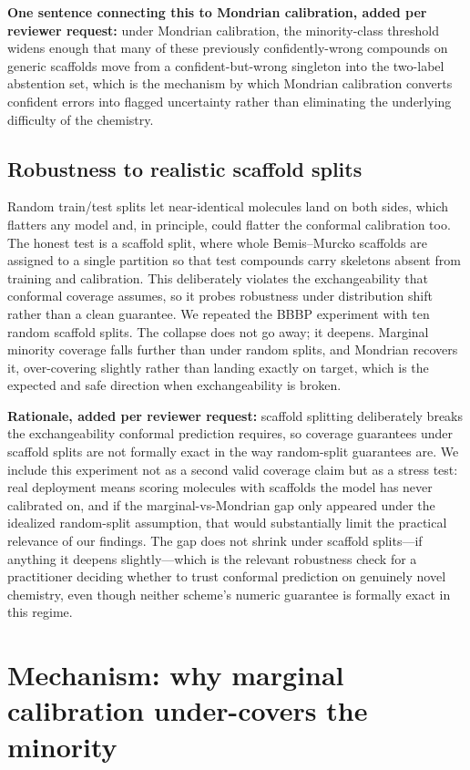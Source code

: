 \documentclass[11pt]{article}
\begin{document}
\textbf{One sentence connecting this to Mondrian calibration, added per reviewer request:} under
Mondrian calibration, the minority-class threshold widens enough that many of these previously
confidently-wrong compounds on generic scaffolds move from a confident-but-wrong singleton into the
two-label abstention set, which is the mechanism by which Mondrian calibration converts confident
errors into flagged uncertainty rather than eliminating the underlying difficulty of the chemistry.

\subsection{Robustness to realistic scaffold splits}

Random train/test splits let near-identical molecules land on both sides, which flatters any model
and, in principle, could flatter the conformal calibration too. The honest test is a scaffold
split, where whole Bemis--Murcko scaffolds are assigned to a single partition so that test compounds
carry skeletons absent from training and calibration. This deliberately violates the exchangeability
that conformal coverage assumes, so it probes robustness under distribution shift rather than a
clean guarantee. We repeated the BBBP experiment with ten random scaffold splits. The collapse does
not go away; it deepens. Marginal minority coverage falls further than under random splits, and
Mondrian recovers it, over-covering slightly rather than landing exactly on target, which is the
expected and safe direction when exchangeability is broken.

\textbf{Rationale, added per reviewer request:} scaffold splitting deliberately breaks the
exchangeability conformal prediction requires, so coverage guarantees under scaffold splits are not
formally exact in the way random-split guarantees are. We include this experiment not as a second
valid coverage claim but as a stress test: real deployment means scoring molecules with scaffolds
the model has never calibrated on, and if the marginal-vs-Mondrian gap only appeared under the
idealized random-split assumption, that would substantially limit the practical relevance of our
findings. The gap does not shrink under scaffold splits---if anything it deepens
slightly---which is the relevant robustness check for a practitioner deciding whether to trust
conformal prediction on genuinely novel chemistry, even though neither scheme's numeric guarantee
is formally exact in this regime.

\section{Mechanism: why marginal calibration under-covers the minority}
\end{document}
